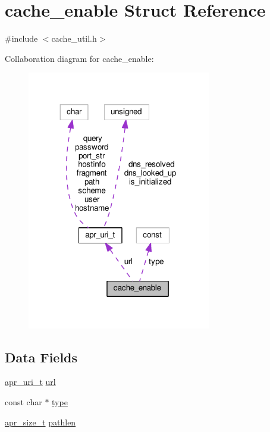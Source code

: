 \hypertarget{structcache__enable}{}\section{cache\+\_\+enable Struct Reference}
\label{structcache__enable}


{\ttfamily \#include $<$cache\+\_\+util.\+h$>$}



Collaboration diagram for cache\+\_\+enable\+:
\nopagebreak
\begin{figure}[H]
\begin{center}
\leavevmode
\includegraphics[width=227pt]{structcache__enable__coll__graph}
\end{center}
\end{figure}
\subsection*{Data Fields}
\begin{DoxyCompactItemize}
\item 
\hyperlink{structapr__uri__t}{apr\+\_\+uri\+\_\+t} \hyperlink{structcache__enable_a1c6a84f032b56cce4d6ba45fb4261454}{url}
\item 
const char $\ast$ \hyperlink{structcache__enable_ac513166fce03604d540df847fc3a4bbe}{type}
\item 
\hyperlink{group__apr__platform_gaaa72b2253f6f3032cefea5712a27540e}{apr\+\_\+size\+\_\+t} \hyperlink{structcache__enable_adce5084f188b489662db5aebcc678803}{pathlen}
\end{DoxyCompactItemize}


